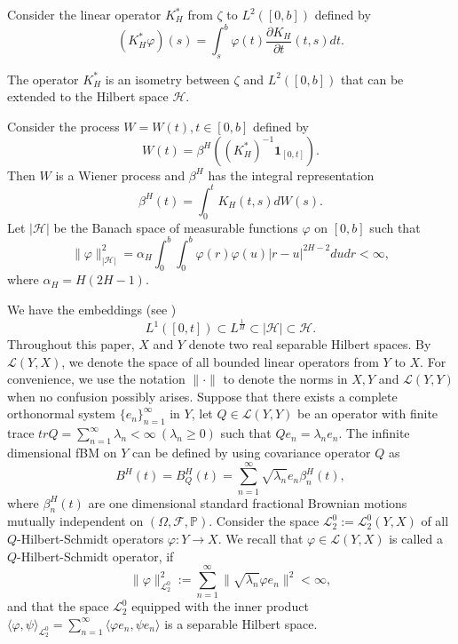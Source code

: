 \documentclass[12pt,a4paper,oneside,reqno,notitlepage]{amsart}
\theoremstyle{plain}
\numberwithin{equation}{section}
\begin{document}
Consider the linear operator $K_{H}^{*}$ from  $\zeta$ to $L^{2}([0,b])$ defined by
\begin{equation*}
(K_{H}^{*}\varphi)(s)=\int_{s}^{b}\varphi(t)\frac{\partial K_{H}}{\partial t}(t,s)dt.
\end{equation*}


The operator $K_{H}^{*}$  is an isometry between $\zeta$ and $L^{2}([0,b])$ that can be extended to the Hilbert space $\mathcal{H}$.

Consider the process $W=W(t),t\in[0,b]$ defined by
\begin{equation*}
W(t)=\beta^{H}((K_{H}^{\ast})^{-1}\textbf{1}_{[0,t]}).
\end{equation*}
Then $W$ is a Wiener process and $\beta^{H}$ has the integral representation
\begin{equation*}
\beta^{H}(t)=\int_{0}^{t}K_{H}(t,s)dW(s).
\end{equation*}
Let $|\mathcal{H}|$ be the Banach space of measurable functions $\varphi$ on $[0,b]$ such that
\begin{equation*}
\|\varphi\|_{|\mathcal{H}|}^{2}=\alpha_{H}\int_{0}^{b}\int_{0}^{b}\varphi(r)\varphi(u)|r-u|^{2H-2}dudr<\infty,
\end{equation*}
where $\alpha_{H}=H(2H-1)$.

We have the embeddings (see \cite{Nualart})
\begin{equation*}
L^{1}([0,t])\subset L^{\frac{1}{H}} \subset |\mathcal{H}|\subset\mathcal{H}.
\end{equation*}
Throughout this paper, $X$ and $Y$ denote two real separable Hilbert spaces. By $\mathcal{L}(Y,X)$, we denote the space of all bounded linear operators from $Y$ to $X$. For convenience, we use the notation $\|\cdot\|$ to denote
the norms in $X, Y$ and $\mathcal{L}(Y,Y)$ when no confusion possibly arises. Suppose that there exists a complete orthonormal system $\{e_{n}\}_{n=1}^{\infty}$ in $Y$, let $Q\in \mathcal{L}(Y,Y)$ be an operator
with finite trace $trQ=\sum_{n=1}^{\infty}\lambda_{n}<\infty \ (\lambda_{n}\geq 0)$ such that $Qe_{n}=\lambda_{n}e_{n}$. The infinite dimensional fBM on $Y$ can be defined by using
covariance operator $Q$ as
\begin{equation*}
B^{H}(t)=B_{Q}^{H}(t)=\sum_{n=1}^{\infty}\sqrt{\lambda_{n}}e_{n}\beta_{n}^{H}(t),
\end{equation*}
where $\beta_{n}^{H}(t)$ are one dimensional standard fractional Brownian motions mutually independent on $(\Omega,\mathcal{F},\mathbb{P})$.
Consider the space $\mathcal{L}_{2}^{0}:=\mathcal{L}_{2}^{0}(Y,X)$ of all $Q$-Hilbert-Schmidt operators $\varphi: Y\rightarrow X$. We recall that $\varphi\in \mathcal{L}(Y,X)$ is called
a $Q$-Hilbert-Schmidt operator, if
\begin{equation*}
\|\varphi\|_{\mathcal{L}_{2}^{0}}^{2}:=\sum_{n=1}^{\infty}\|\sqrt{\lambda_{n}}\varphi e_{n}\|^{2}<\infty,
\end{equation*}
and that the space $\mathcal{L}_{2}^{0}$ equipped with the inner product $\langle\varphi,\psi\rangle_{\mathcal{L}_{2}^{0}}=\sum_{n=1}^{\infty}\langle\varphi e_{n}, \psi e_{n}\rangle$ is a separable Hilbert space.
\end{document}
